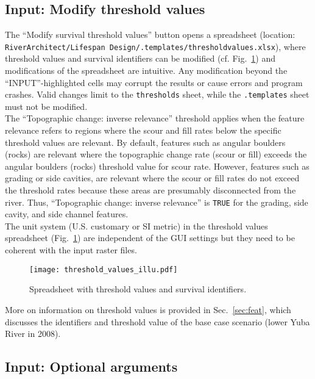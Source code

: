 \subsection{Input: Modify threshold values} \label{sec:modthresh}
The ``Modify survival threshold values'' button opens a spreadsheet (location: \texttt{RiverArchitect/Lifespan Design/.templates/threshold{\myUnderscore}values.xlsx}), where threshold values and survival identifiers can be modified (cf. Fig.~\ref{fig:threshold_values_illu}) and modifications of the spreadsheet are intuitive. Any modification beyond the ``INPUT''-highlighted cells may corrupt the results or cause errors and program crashes. Valid changes limit to the \texttt{thresholds} sheet, while the \texttt{.templates} sheet must not be modified.\\
The ``Topographic change: inverse relevance'' threshold applies when the feature relevance refers to regions where the scour and fill rates below the specific threshold values are relevant. By default, features such as angular boulders (rocks) are relevant where the topographic change rate (scour or fill) exceeds the angular boulders (rocks) threshold value for scour rate. However, features such as grading or side cavities, are relevant where the scour or fill rates do not exceed the threshold rates because these areas are presumably disconnected from the river. Thus, ``Topographic change: inverse relevance'' is \texttt{TRUE} for the grading, side cavity, and side channel features.\\
The unit system (U.S. customary or SI metric) in the threshold values spreadsheet (Fig.~\ref{fig:threshold_values_illu}) are independent of the GUI settings but they need to be coherent with the input raster files. 

\begin{figure}[hbt]
	\begin{center}
	\texttt{[image: threshold\_values\_illu.pdf]} %
	\caption{Spreadsheet with threshold values and survival identifiers. \label{fig:threshold_values_illu}}
	\end{center}
\end{figure}

More on information on threshold values is provided in Sec.~\ref{sec:feat}, which discusses the identifiers and threshold value of the base case scenario (lower Yuba River in 2008).

\subsection{Input: Optional arguments}

